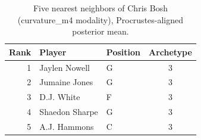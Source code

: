 \begin{table}[htbp]
  \centering\small
  \begin{tabular}{rllc}
    \toprule
    Rank & Player & Position & Archetype \\
    \midrule
    1 & Jaylen Nowell & G & 3 \\
    2 & Jumaine Jones & G & 3 \\
    3 & D.J. White & F & 3 \\
    4 & Shaedon Sharpe & G & 3 \\
    5 & A.J. Hammons & C & 3 \\
    \bottomrule
  \end{tabular}
  \caption{Five nearest neighbors of Chris Bosh (curvature_m4 modality), Procrustes-aligned posterior mean.}
  \label{tab:Chris_Bosh_neighbors_curvature_m4}
\end{table}

